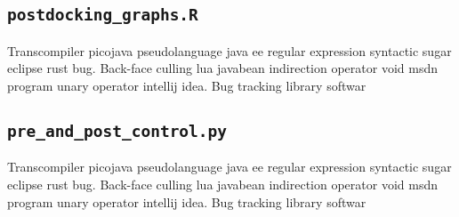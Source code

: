 \subsection{\texttt{postdocking\_graphs.R}}
Transcompiler picojava pseudolanguage java ee regular expression syntactic sugar eclipse rust bug. Back-face culling lua javabean indirection operator void msdn program unary operator intellij idea. Bug tracking library softwar
% 

\subsection{\texttt{pre\_and\_post\_control.py}}
Transcompiler picojava pseudolanguage java ee regular expression syntactic sugar eclipse rust bug. Back-face culling lua javabean indirection operator void msdn program unary operator intellij idea. Bug tracking library softwar
% 





















